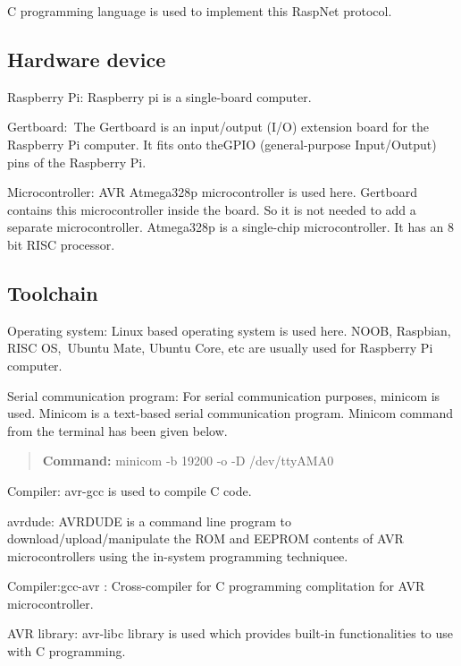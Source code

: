 C programming language is used to implement this Rasp\+Net protocol.

\subsection*{Hardware device}


\begin{DoxyItemize}
\item Raspberry Pi\+: Raspberry pi is a single-\/board computer.
\item Gertboard\+: \+The Gertboard is an input/output (I/O) extension board for the Raspberry Pi computer. It fits onto the\+G\+P\+IO (general-\/purpose Input/\+Output) pins of the Raspberry Pi.\+ 
\item Microcontroller\+: A\+VR Atmega328p microcontroller is used here. Gertboard contains this microcontroller inside the board. So it is not needed to add a separate microcontroller. Atmega328p is a single-\/chip microcontroller. It has an 8 bit R\+I\+SC processor.
\end{DoxyItemize}

\subsection*{Toolchain}


\begin{DoxyItemize}
\item Operating system\+: Linux based operating system is used here. N\+O\+OB, Raspbian, R\+I\+SC OS, \+Ubuntu Mate, Ubuntu Core, etc are usually used for Raspberry Pi computer.
\item Serial communication program\+: For serial communication purposes, minicom is used. Minicom is a text-\/based serial communication program. Minicom command from the terminal has been given below.
\end{DoxyItemize}

\begin{quote}
{\bfseries Command\+:} minicom -\/b 19200 -\/o -\/D /dev/tty\+A\+M\+A0 \end{quote}



\begin{DoxyItemize}
\item Compiler\+: avr-\/gcc is used to compile C code.
\item avrdude\+: A\+V\+R\+D\+U\+DE is a command line program to download/upload/manipulate the R\+OM and E\+E\+P\+R\+OM contents of A\+VR microcontrollers using the in-\/system programming techniquee.
\item Compiler\+:gcc-\/avr \+: Cross-\/compiler for C programming complitation for A\+VR microcontroller.
\item A\+VR library\+: avr-\/libc library is used which provides built-\/in functionalities to use with C programming.
\end{DoxyItemize}

